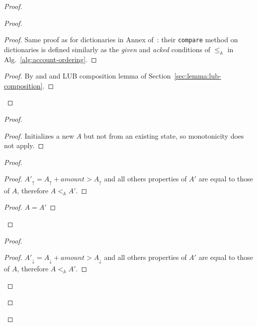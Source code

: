 \documentclass[9pt]{article}   	%
\begin{document}
\begin{proof}
\begin{proof}
			\begin{proof}
				Same proof as for dictionaries in Annex of~\cite{lavoie2023statebased}: their \texttt{compare} method on dictionaries is defined similarly as the  \textit{given} and \textit{acked} conditions of $\leq_\mathds{A}$ in Alg.~\ref{alg:account-ordering}.
			\end{proof}
			
			\qedstep
			\begin{proof}
				By  and  and LUB composition lemma of Section~\ref{sec:lemma:lub-composition}.
			\end{proof}
		\end{proof}

	
	\begin{proof}
		\begin{proof}
			Initializes a new $A$ but not from an existing state, so monotonicity does not apply.
		\end{proof}
		
		\begin{proof}
			\begin{proof}
				$A'_\uparrow = A_\uparrow + \textit{amount} > A_\uparrow$ and all others properties of $A'$ are equal to those of $A$, therefore $A <_\mathds{A} A'$.
			\end{proof}
			
			\begin{proof}
				$A=A'$
			\end{proof}
		\end{proof}
		
		\begin{proof}
			\begin{proof}
				$A'_\downarrow = A_\downarrow + \textit{amount} > A_\downarrow$ and all others properties of $A'$ are equal to those of $A$, therefore $A <_\mathds{A} A'$. 
			\end{proof}
			

\end{proof}
\end{proof}
\end{proof}
\end{document}
